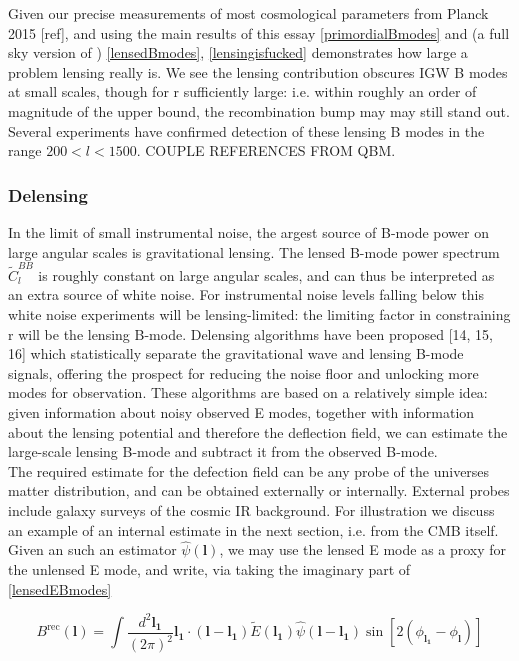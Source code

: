 \documentclass[a4paper,10pt]{article}
\renewcommand{\v}[1]{\mathbf{#1}}
\newcommand{\finttwo}[1]{\int \frac{d^2 \v{#1}}{(2\pi)^2}}
\begin{document}
Given our precise measurements of most cosmological parameters from Planck 2015 [ref], and using the main results of this essay \ref{primordialBmodes} and (a full sky version of ) \ref{lensedBmodes}, \ref{lensingisfucked} demonstrates how large a problem lensing really is. We see the lensing contribution obscures IGW B modes at small scales, though for r sufficiently large: i.e. within roughly an order of magnitude of the upper bound, the recombination bump may may still stand out. Several experiments have confirmed detection of  these lensing B modes in the range $200<l<1500$. COUPLE REFERENCES FROM QBM. \\

\subsubsection{Delensing}

In the limit of small instrumental noise, the argest source of B-mode power on large angular scales is gravitational lensing. The lensed B-mode power spectrum $\tilde{C}^{BB}_l$ is roughly constant on large angular scales, and can thus be interpreted as an extra source of white noise. For instrumental noise levels falling below this white noise experiments will be lensing-limited: the limiting factor in constraining r will be the lensing B-mode. Delensing algorithms have been proposed [14, 15, 16] which statistically separate the gravitational wave and lensing B-mode signals, offering the prospect for reducing the noise floor and unlocking more modes for observation. These algorithms are based on a relatively simple idea: given information about noisy observed E modes, together with information about the lensing potential and therefore the deflection field, we can estimate the large-scale lensing B-mode and subtract it from the observed B-mode.\\

The required estimate for the defection field can be any probe of the universes matter distribution, and can be obtained externally or internally. External probes include galaxy surveys of the cosmic IR background. For illustration we discuss an example of an internal estimate in the next section, i.e. from the CMB itself.\\

Given an such an estimator $\hat{\psi}(\v{l})$, we may use the lensed E mode as a proxy for the unlensed E mode, and write, via taking the imaginary part of \ref{lensedEBmodes}

\begin{equation}
B^{\text{rec}}(\v{l}) = \finttwo{l_1} \v{l_1}\cdot(\v{l}-\v{l_1}) \tilde{E}(\v{l_1})\hat{\psi}(\v{l}-\v{l_1})\sin[2(\phi_\v{l_1}-\phi_\v{l})]
\end{equation} 
\end{document}
